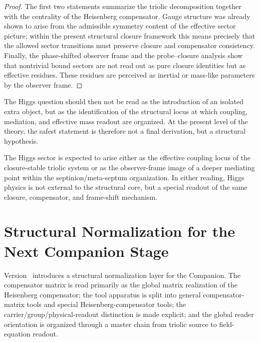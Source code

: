 \begin{proof}
The first two statements summarize the triolic decomposition together with the
centrality of the Heisenberg compensator. Gauge structure was already shown to
arise from the admissible symmetry content of the effective sector picture;
within the present structural closure framework this means precisely that the
allowed sector transitions must preserve closure and compensator consistency.
Finally, the phase-shifted observer frame and the probe--closure analysis show
that nontrivial bound sectors are not read out as pure closure identities but
as effective residues. These residues are perceived as inertial or mass-like
parameters by the observer frame.
\end{proof}

The Higgs question should then not be read as the introduction of an isolated
extra object, but as the identification of the structural locus at which
coupling, mediation, and effective mass readout are organized. At the present
level of the theory, the safest statement is therefore not a final derivation,
but a structural hypothesis.

\begin{remark}
\label{rem:structural-higgs-role}
The Higgs sector is expected to arise either as the effective coupling locus of
the closure-stable triolic system or as the observer-frame image of a deeper
mediating point within the septinion/meta-septum organization. In either
reading, Higgs physics is not external to the structural core, but a special
readout of the same closure, compensator, and frame-shift mechanism.
\end{remark}




\section{Structural Normalization for the Next Companion Stage}
\label{sec:structural-normalization}

\begin{remark}
Version \docversion\ introduces a structural normalization layer for the
Companion. The compensator matrix is read primarily as the global matrix
realization of the Heisenberg compensator; the tool apparatus is split into
general compensator-matrix tools and special Heisenberg-compensator tools; the
carrier/group/physical-readout distinction is made explicit; and the global
reader orientation is organized through a master chain from triolic source to
field-equation readout.
\end{remark}

